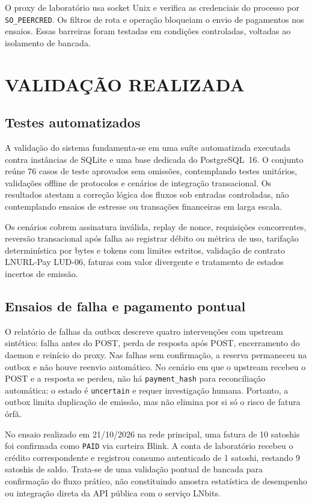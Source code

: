 \documentclass[openright]{normas-utf-tex}
\begin{document}
O proxy de laboratório usa socket Unix e verifica as credenciais do processo por \texttt{SO\_PEERCRED}. Os filtros de rota e operação bloqueiam o envio de pagamentos nos ensaios. Essas barreiras foram testadas em condições controladas, voltadas ao isolamento de bancada.

\chapter{VALIDAÇÃO REALIZADA}
\section{Testes automatizados}
A validação do sistema fundamenta-se em uma suíte automatizada executada contra instâncias de SQLite e uma base dedicada do PostgreSQL~16. O conjunto reúne 76 casos de teste aprovados sem omissões, contemplando testes unitários, validações offline de protocolos e cenários de integração transacional. Os resultados atestam a correção lógica dos fluxos sob entradas controladas, não contemplando ensaios de estresse ou transações financeiras em larga escala.

Os cenários cobrem assinatura inválida, replay de nonce, requisições concorrentes, reversão transacional após falha ao registrar débito ou métrica de uso, tarifação determinística por bytes e tokens com limites estritos, validação de contrato LNURL-Pay LUD-06, faturas com valor divergente e tratamento de estados incertos de emissão.

\section{Ensaios de falha e pagamento pontual}
O relatório de falhas da outbox descreve quatro intervenções com upstream sintético: falha antes do POST, perda de resposta após POST, encerramento do daemon e reinício do proxy. Nas falhas sem confirmação, a reserva permaneceu na outbox e não houve reenvio automático. No cenário em que o upstream recebeu o POST e a resposta se perdeu, não há \texttt{payment\_hash} para reconciliação automática: o estado é \texttt{uncertain} e requer investigação humana. Portanto, a outbox limita duplicação de emissão, mas não elimina por si só o risco de fatura órfã.

No ensaio realizado em 21/10/2026 na rede principal, uma fatura de 10 satoshis foi confirmada como \texttt{PAID} via carteira Blink. A conta de laboratório recebeu o crédito correspondente e registrou consumo autenticado de 1 satoshi, restando 9 satoshis de saldo. Trata-se de uma validação pontual de bancada para confirmação do fluxo prático, não constituindo amostra estatística de desempenho ou integração direta da API pública com o serviço LNbits.
\end{document}
